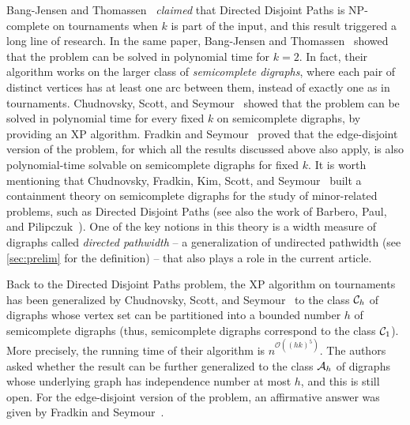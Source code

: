 \documentclass[a4paper,UKenglish,cleveref, autoref, thm-restate]{lipics-v2021}
\renewcommand{\NP}{{\sf NP}\xspace}
\renewcommand{\XP}{{\sf XP}\xspace}
\newcommand{\bigO}[1]{\mathcal{O}\!\left(#1\right)}
\begin{document}
Bang-Jensen and Thomassen~\cite{thomassen_tournament_nph} {\sl claimed} that {\sc
Directed Disjoint Paths} is \NP-complete on tournaments when $k$ is part of the input,
and this result triggered a long line of research. In the same paper, Bang-Jensen and
Thomassen~\cite{thomassen_tournament_nph} showed that the problem can be solved in
polynomial time for $k=2$. In fact, their algorithm works on the larger class of
\emph{semicomplete digraphs},  where each pair of distinct vertices has at least one arc between them, instead of exactly one as in tournaments.
Chudnovsky, Scott, and Seymour~\cite{Disjoint-paths-in-tournaments} showed that the
problem can be solved in polynomial time for every fixed $k$ on semicomplete digraphs, by
providing an \XP algorithm. Fradkin and Seymour~\cite{FradkinS15} proved that the
edge-disjoint version of the problem, for which all the results discussed above also
apply, is also polynomial-time solvable on semicomplete digraphs for fixed $k$. It is
worth mentioning that Chudnovsky, Fradkin, Kim, Scott, and
Seymour~\cite{ChudnovskyFS12,Disjoint-paths-in-tournaments,ChudnovskyS11,FradkinS15,FradkinS13,KimS15}
built a containment theory on semicomplete digraphs for the study of minor-related
problems, such as {\sc Directed Disjoint Paths} (see also the work of  Barbero, Paul, and
Pilipczuk~\cite{BarberoPP19}). One of the key notions in this theory is a width measure
of digraphs called \emph{directed pathwidth} -- a generalization of undirected
pathwidth (see \autoref{sec:prelim} for the
definition) -- that also plays a role in the current article.

Back to the {\sc Directed Disjoint Paths} problem, the \XP algorithm on
tournaments~\cite{Disjoint-paths-in-tournaments} has been generalized by Chudnovsky,
Scott, and Seymour~\cite{chudnovsky_union_of_tournaments} to the class
${\cal C}_h$ of digraphs whose vertex set can be partitioned into a bounded number $h$
of semicomplete digraphs (thus, semicomplete digraphs correspond to the class ${\cal
C}_1$). More precisely, the running time of their algorithm is $n^{\bigO{(hk)^5}}$. The
authors asked whether the result can be further generalized to the class ${\cal A}_h$ of
digraphs whose underlying graph has independence number at most $h$, and this is still
open. For the edge-disjoint version of the problem, an affirmative answer was given by
Fradkin and Seymour~\cite{FradkinS15}.
\end{document}
